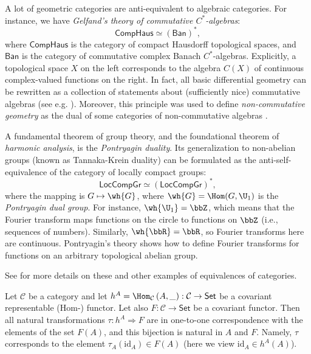\begin{example}
A lot of geometric categories are anti-equivalent to algebraic categories.
For instance, we have \emph{Gelfand's theory of commutative $C^{\ast}$-algebras}:
\[
\mathsf{CompHaus}\simeq\left(\mathsf{Ban}\right)^{\ast},
\]
where $\mathsf{CompHaus}$ is the category of compact Hausdorff topological
spaces, and $\mathsf{Ban}$ is the category of commutative complex
Banach $C^{\ast}$-algebras. Explicitly, a topological space $X$
on the left corresponds to the algebra $C\left(X\right)$ of continuous
complex-valued functions on the right. In fact, all basic differential
geometry can be rewritten as a collection of statements about (sufficiently nice)
commutative algebras (see e.g. \cite{JetNest}). Moreover, this principle was used to define \emph{non-commutative geometry} as the dual of some categories of non-commutative algebras \cite{Connes}.
\end{example}
%
\begin{example}
A fundamental theorem of group theory, and the foundational theorem
of \emph{harmonic analysis}, is the \emph{Pontryagin duality}.
Its generalization to non-abelian groups (known as Tannaka-Krein duality)
can be formulated as the anti-self-equivalence of the category of
locally compact groups:
\[
\mathsf{LocCompGr}\simeq\left(\mathsf{LocCompGr}\right)^{\ast},
\]
where the mapping is $G\mapsto\wh{G}$, where $\wh{G}=\Hom(G,\U_1)$ is the \emph{Pontryagin dual group}.  For instance, $\wh{\U_1}=\bbZ$, which means that the
Fourier transform maps functions on the circle to functions on $\bbZ$
(i.e., sequences of numbers). Similarly, $\wh{\bbR }=\bbR $,
so Fourier transforms here are continuous. Pontryagin's theory shows
how to define Fourier transforms for functions on an arbitrary topological
abelian group.

See \cite[II.2]{GelMan} for more details on these and other examples
of equivalences of categories.
\end{example}
\begin{thm}\label{Yoneda}
Let $\mathcal{C}$ be a category and let $h^{A}=\Hom_{\mathcal{C}}\left(A,\_\right):\mathcal{C}\to\mathsf{Set}$
be a covariant representable (Hom-) functor. Let also $F:\mathcal{C}\to\mathsf{Set}$
be a covariant functor. Then all natural transformations $\tau:h^{A}\Longrightarrow F$
are in one-to-one correspondence with the elements of the set $F(A)$,
and this bijection is natural in $A$ and $F$. Namely, $\tau$ corresponds to the element $\tau_A(\mathrm{id}_A)\in F(A)$ (here we view $\mathrm{id}_A\in h^A(A)$).
\end{thm}
